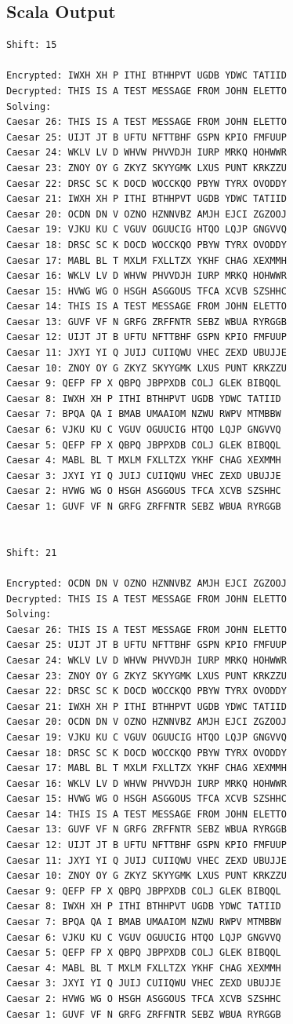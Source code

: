 \documentclass{report}
\begin{document}
\subsection*{Scala Output}
\begin{lstlisting}
Shift: 15

Encrypted: IWXH XH P ITHI BTHHPVT UGDB YDWC TATIID
Decrypted: THIS IS A TEST MESSAGE FROM JOHN ELETTO
Solving:
Caesar 26: THIS IS A TEST MESSAGE FROM JOHN ELETTO
Caesar 25: UIJT JT B UFTU NFTTBHF GSPN KPIO FMFUUP
Caesar 24: WKLV LV D WHVW PHVVDJH IURP MRKQ HOHWWR
Caesar 23: ZNOY OY G ZKYZ SKYYGMK LXUS PUNT KRKZZU
Caesar 22: DRSC SC K DOCD WOCCKQO PBYW TYRX OVODDY
Caesar 21: IWXH XH P ITHI BTHHPVT UGDB YDWC TATIID
Caesar 20: OCDN DN V OZNO HZNNVBZ AMJH EJCI ZGZOOJ
Caesar 19: VJKU KU C VGUV OGUUCIG HTQO LQJP GNGVVQ
Caesar 18: DRSC SC K DOCD WOCCKQO PBYW TYRX OVODDY
Caesar 17: MABL BL T MXLM FXLLTZX YKHF CHAG XEXMMH
Caesar 16: WKLV LV D WHVW PHVVDJH IURP MRKQ HOHWWR
Caesar 15: HVWG WG O HSGH ASGGOUS TFCA XCVB SZSHHC
Caesar 14: THIS IS A TEST MESSAGE FROM JOHN ELETTO
Caesar 13: GUVF VF N GRFG ZRFFNTR SEBZ WBUA RYRGGB
Caesar 12: UIJT JT B UFTU NFTTBHF GSPN KPIO FMFUUP
Caesar 11: JXYI YI Q JUIJ CUIIQWU VHEC ZEXD UBUJJE
Caesar 10: ZNOY OY G ZKYZ SKYYGMK LXUS PUNT KRKZZU
Caesar 9: QEFP FP X QBPQ JBPPXDB COLJ GLEK BIBQQL
Caesar 8: IWXH XH P ITHI BTHHPVT UGDB YDWC TATIID
Caesar 7: BPQA QA I BMAB UMAAIOM NZWU RWPV MTMBBW
Caesar 6: VJKU KU C VGUV OGUUCIG HTQO LQJP GNGVVQ
Caesar 5: QEFP FP X QBPQ JBPPXDB COLJ GLEK BIBQQL
Caesar 4: MABL BL T MXLM FXLLTZX YKHF CHAG XEXMMH
Caesar 3: JXYI YI Q JUIJ CUIIQWU VHEC ZEXD UBUJJE
Caesar 2: HVWG WG O HSGH ASGGOUS TFCA XCVB SZSHHC
Caesar 1: GUVF VF N GRFG ZRFFNTR SEBZ WBUA RYRGGB


Shift: 21

Encrypted: OCDN DN V OZNO HZNNVBZ AMJH EJCI ZGZOOJ
Decrypted: THIS IS A TEST MESSAGE FROM JOHN ELETTO
Solving:
Caesar 26: THIS IS A TEST MESSAGE FROM JOHN ELETTO
Caesar 25: UIJT JT B UFTU NFTTBHF GSPN KPIO FMFUUP
Caesar 24: WKLV LV D WHVW PHVVDJH IURP MRKQ HOHWWR
Caesar 23: ZNOY OY G ZKYZ SKYYGMK LXUS PUNT KRKZZU
Caesar 22: DRSC SC K DOCD WOCCKQO PBYW TYRX OVODDY
Caesar 21: IWXH XH P ITHI BTHHPVT UGDB YDWC TATIID
Caesar 20: OCDN DN V OZNO HZNNVBZ AMJH EJCI ZGZOOJ
Caesar 19: VJKU KU C VGUV OGUUCIG HTQO LQJP GNGVVQ
Caesar 18: DRSC SC K DOCD WOCCKQO PBYW TYRX OVODDY
Caesar 17: MABL BL T MXLM FXLLTZX YKHF CHAG XEXMMH
Caesar 16: WKLV LV D WHVW PHVVDJH IURP MRKQ HOHWWR
Caesar 15: HVWG WG O HSGH ASGGOUS TFCA XCVB SZSHHC
Caesar 14: THIS IS A TEST MESSAGE FROM JOHN ELETTO
Caesar 13: GUVF VF N GRFG ZRFFNTR SEBZ WBUA RYRGGB
Caesar 12: UIJT JT B UFTU NFTTBHF GSPN KPIO FMFUUP
Caesar 11: JXYI YI Q JUIJ CUIIQWU VHEC ZEXD UBUJJE
Caesar 10: ZNOY OY G ZKYZ SKYYGMK LXUS PUNT KRKZZU
Caesar 9: QEFP FP X QBPQ JBPPXDB COLJ GLEK BIBQQL
Caesar 8: IWXH XH P ITHI BTHHPVT UGDB YDWC TATIID
Caesar 7: BPQA QA I BMAB UMAAIOM NZWU RWPV MTMBBW
Caesar 6: VJKU KU C VGUV OGUUCIG HTQO LQJP GNGVVQ
Caesar 5: QEFP FP X QBPQ JBPPXDB COLJ GLEK BIBQQL
Caesar 4: MABL BL T MXLM FXLLTZX YKHF CHAG XEXMMH
Caesar 3: JXYI YI Q JUIJ CUIIQWU VHEC ZEXD UBUJJE
Caesar 2: HVWG WG O HSGH ASGGOUS TFCA XCVB SZSHHC
Caesar 1: GUVF VF N GRFG ZRFFNTR SEBZ WBUA RYRGGB

\end{lstlisting}
\end{document}
